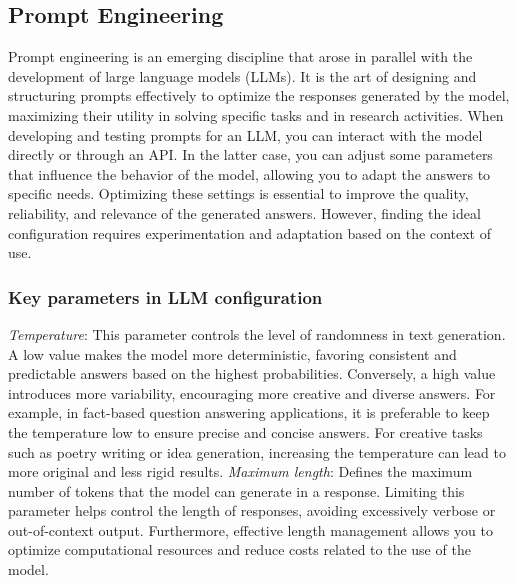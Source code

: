 \subsection{Prompt Engineering}
Prompt engineering is an emerging discipline that arose in parallel with the development of large language models (LLMs). It is the art of designing and structuring prompts effectively to optimize the responses generated by the model, maximizing their utility in solving specific tasks and in research activities.
When developing and testing prompts for an LLM, you can interact with the model directly or through an API. In the latter case, you can adjust some parameters that influence the behavior of the model, allowing you to adapt the answers to specific needs. Optimizing these settings is essential to improve the quality, reliability, and relevance of the generated answers. However, finding the ideal configuration requires experimentation and adaptation based on the context of use.
\newline
\subsubsection{Key parameters in LLM configuration}
\textit{Temperature}:\newline
This parameter controls the level of randomness in text generation. A low value makes the model more deterministic, favoring consistent and predictable answers based on the highest probabilities. Conversely, a high value introduces more variability, encouraging more creative and diverse answers. For example, in fact-based question answering applications, it is preferable to keep the temperature low to ensure precise and concise answers. For creative tasks such as poetry writing or idea generation, increasing the temperature can lead to more original and less rigid results.
\newline
\textit{Maximum length}:\newline
Defines the maximum number of tokens that the model can generate in a response. Limiting this parameter helps control the length of responses, avoiding excessively verbose or out-of-context output. Furthermore, effective length management allows you to optimize computational resources and reduce costs related to the use of the model.
